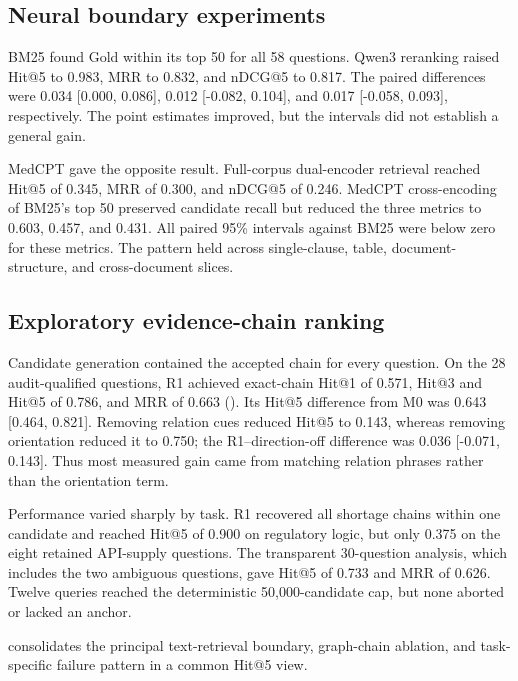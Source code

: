 

\subsection{Neural boundary experiments}

BM25 found Gold within its top 50 for all 58 questions. Qwen3 reranking raised Hit@5 to 0.983, MRR to 0.832, and nDCG@5 to 0.817. The paired differences were 0.034 [0.000, 0.086], 0.012 [-0.082, 0.104], and 0.017 [-0.058, 0.093], respectively. The point estimates improved, but the intervals did not establish a general gain.

MedCPT gave the opposite result. Full-corpus dual-encoder retrieval reached Hit@5 of 0.345, MRR of 0.300, and nDCG@5 of 0.246. MedCPT cross-encoding of BM25's top 50 preserved candidate recall but reduced the three metrics to 0.603, 0.457, and 0.431. All paired 95\% intervals against BM25 were below zero for these metrics. The pattern held across single-clause, table, document-structure, and cross-document slices.



\subsection{Exploratory evidence-chain ranking}

Candidate generation contained the accepted chain for every question. On the 28 audit-qualified questions, R1 achieved exact-chain Hit@1 of 0.571, Hit@3 and Hit@5 of 0.786, and MRR of 0.663 (). Its Hit@5 difference from M0 was 0.643 [0.464, 0.821]. Removing relation cues reduced Hit@5 to 0.143, whereas removing orientation reduced it to 0.750; the R1--direction-off difference was 0.036 [-0.071, 0.143]. Thus most measured gain came from matching relation phrases rather than the orientation term.

Performance varied sharply by task. R1 recovered all shortage chains within one candidate and reached Hit@5 of 0.900 on regulatory logic, but only 0.375 on the eight retained API-supply questions. The transparent 30-question analysis, which includes the two ambiguous questions, gave Hit@5 of 0.733 and MRR of 0.626. Twelve queries reached the deterministic 50,000-candidate cap, but none aborted or lacked an anchor.



 consolidates the principal text-retrieval boundary, graph-chain ablation, and task-specific failure pattern in a common Hit@5 view.

